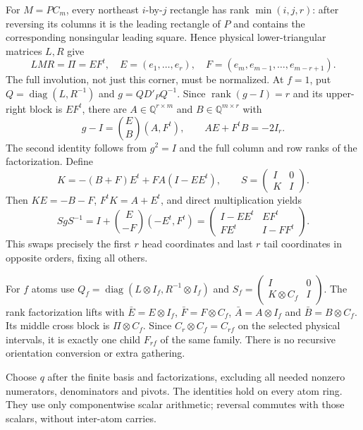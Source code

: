 For $M=PC_m$, every northeast $i$-by-$j$ rectangle has rank
$\min(i,j,r)$: after reversing its columns it is the leading rectangle
of $P$ and contains the corresponding nonsingular leading square.
Hence physical lower-triangular matrices $L,R$ give
\[
 LMR=\Pi=EF^t,\quad E=(e_1,\ldots,e_r),\quad
 F=(e_m,e_{m-1},\ldots,e_{m-r+1}).
\]
The full involution, not just this corner, must be normalized.
At $f=1$, put $Q=\operatorname{diag}(L,R^{-1})$ and
$g=QD'_PQ^{-1}$. Since $\operatorname{rank}(g-I)=r$ and its upper-right
block is $EF^t$, there are $A\in\mathbb Q^{r\times m}$ and
$B\in\mathbb Q^{m\times r}$ with
\[
 g-I=\binom EB(A,F^t),\qquad AE+F^tB=-2I_r.
\]
The second identity follows from $g^2=I$ and the full column and row
ranks of the factorization. Define
\[
 K=-(B+F)E^t+FA(I-EE^t),\qquad
 S=\begin{pmatrix}I&0\\K&I\end{pmatrix}.
\]
Then $KE=-B-F$, $F^tK=A+E^t$, and direct multiplication yields
\[
 SgS^{-1}=I+\binom E{-F}(-E^t,F^t)
 =\begin{pmatrix}I-EE^t&EF^t\\FE^t&I-FF^t\end{pmatrix}.
\]
This swaps precisely the first $r$ head coordinates and last $r$ tail
coordinates in opposite orders, fixing all others.

For $f$ atoms use $Q_f=\operatorname{diag}(L\otimes I_f,R^{-1}\otimes I_f)$
and $S_f=\left(\begin{smallmatrix}I&0\\K\otimes C_f&I\end{smallmatrix}\right)$.
The rank factorization lifts with $\bar E=E\otimes I_f$,
$\bar F=F\otimes C_f$, $\bar A=A\otimes I_f$ and
$\bar B=B\otimes C_f$. Its middle cross block is $\Pi\otimes C_f$.
Since $C_r\otimes C_f=C_{rf}$ on the selected physical intervals,
it is exactly one child $F_{rf}$ of the same family. There is no
recursive orientation conversion or extra gathering.

Choose $q$ after the finite basis and factorizations, excluding all
needed nonzero numerators, denominators and pivots. The identities hold
on every atom ring. They use only componentwise scalar arithmetic;
reversal commutes with those scalars, without inter-atom carries.

